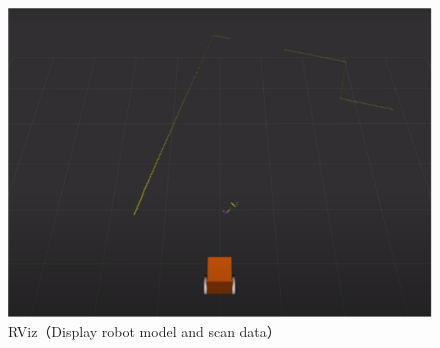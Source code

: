   \begin{figure}[h]
    \centering
    \includegraphics[keepaspectratio, scale=0.60] {images/RobotGuidance_rviz.png}
    \caption{RViz（Display robot model and scan data）}
    \label{Fig:RobotGuidance_rviz}
  \end{figure}

\newpage
